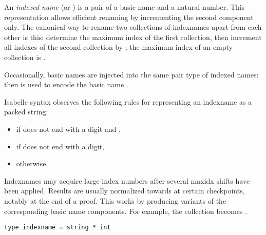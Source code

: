 \begin{isabellebody}
%
\endisadelimML
\isanewline
{}\isamarkupfalse%
%
\isamarkuptrue%
%
\begin{isamarkuptext}%
An \emph{indexed name} (or ) is a pair of a basic
  name and a natural number.  This representation allows efficient
  renaming by incrementing the second component only.  The canonical
  way to rename two collections of indexnames apart from each other is
  this: determine the maximum index  of the first
  collection, then increment all indexes of the second collection by
  ; the maximum index of an empty collection is
  .

  Occasionally, basic names are injected into the same pair type of
  indexed names: then  is used to encode the basic
  name .

  \medskip Isabelle syntax observes the following rules for
  representing an indexname  as a packed string:

  \begin{itemize}

  \item {} if  does not end with a digit and ,

  \item {} if  does not end with a digit,

  \item {} otherwise.

  \end{itemize}

  Indexnames may acquire large index numbers after several maxidx
  shifts have been applied.  Results are usually normalized towards
   at certain checkpoints, notably at the end of a proof.
  This works by producing variants of the corresponding basic name
  components.  For example, the collection 
  becomes .%
\end{isamarkuptext}%
\isamarkuptrue%
%
\isadelimmlref
%
\endisadelimmlref
%
\isatagmlref
%
\begin{isamarkuptext}%
\begin{mldecls}
  \verb|type indexname = string * int| \\
  \end{mldecls}


\end{isamarkuptext}
\end{isabellebody}
